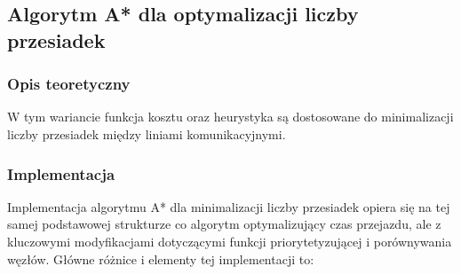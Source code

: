 \documentclass[12pt,a4paper]{article}
\begin{document}
\subsection{Algorytm A* dla optymalizacji liczby przesiadek}
\subsubsection{Opis teoretyczny}
W tym wariancie funkcja kosztu oraz heurystyka są dostosowane do minimalizacji liczby przesiadek między liniami komunikacyjnymi.

\subsubsection{Implementacja}
Implementacja algorytmu A* dla minimalizacji liczby przesiadek opiera się na tej samej podstawowej strukturze co algorytm optymalizujący czas przejazdu, ale z kluczowymi modyfikacjami dotyczącymi funkcji priorytetyzującej i porównywania węzłów. Główne różnice i elementy tej implementacji to:
\end{document}
